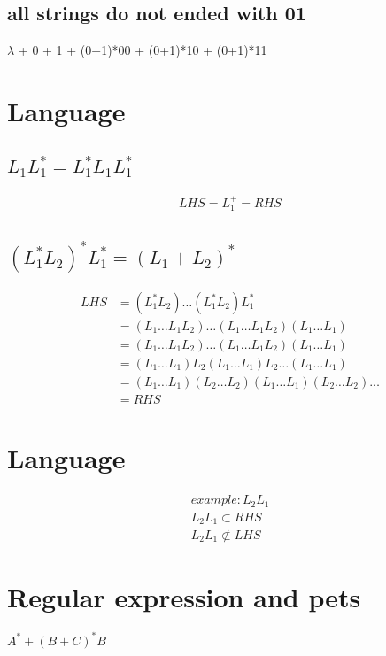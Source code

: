 \documentclass{article}
\begin{document}
\subsection{all strings do not ended with 01}
$\lambda$ + 0 + 1 + (0+1)*00 + (0+1)*10 + (0+1)*11

\section{Language}

\subsection{$L_1L_1^* = L_1^* L_1 L_1^*$}
\begin{align*}
LHS = L_1^+ = RHS
\end{align*}

\subsection{$(L_1^*L_2)^*L_1^* = (L_1 + L_2)^*$}
\begin{align*}
LHS
&= (L_1^*L_2) \dots (L_1^*L_2) L_1^*\\
&= (L_1 \dots L_1 L_2) \dots (L_1 \dots L_1 L_2) (L_1 \dots L_1)\\
&= (L_1 \dots L_1 L_2) \dots (L_1 \dots L_1 L_2) (L_1 \dots L_1)\\
&= (L_1 \dots L_1) L_2 (L_1 \dots L_1) L_2 \dots (L_1 \dots L_1)\\
&= (L_1 \dots L_1) (L_2 \dots L_2) (L_1 \dots L_1) (L_2 \dots L_2) \dots\\
&= RHS
\end{align*}

\section{Language}
\begin{align*}
example:L_2L_1\\
L_2L_1 \subset RHS\\
L_2L_1 \not\subset LHS
\end{align*}

\section{Regular expression and pets}
$A^* + (B+C)^*B$
\end{document}
